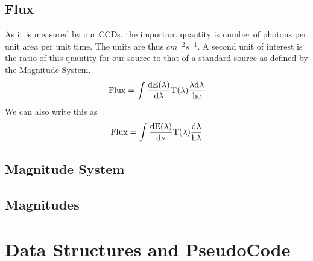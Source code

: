 \documentclass{article}[12pt]
\begin{document}
\subsection{Flux} As it is measured by our CCDs, the important quantity is 
number of photons per unit area per unit time. The units are thus
$cm^{-2} s^{-1}$. A second unit of interest is the ratio of this quantity for our source to that of a standard source as defined by the Magnitude System.
\begin{equation}
\rm{Flux} = \int \frac{dE(\lambda)}{d\lambda} T(\lambda)
    \frac{\lambda d\lambda}{hc}
    \label{eqn:FluxFromflambda}
\end{equation}
We can also write this as 
\begin{equation}
    \rm{Flux} = \int \frac{dE(\lambda)}{d\nu} T(\lambda) \frac{d\lambda}{h\lambda}
    \label{eqn:FluxFromfnu}
\end{equation}
\subsection{Magnitude System}

\subsection{Magnitudes}

\section{Data Structures and PseudoCode}
\end{document}
